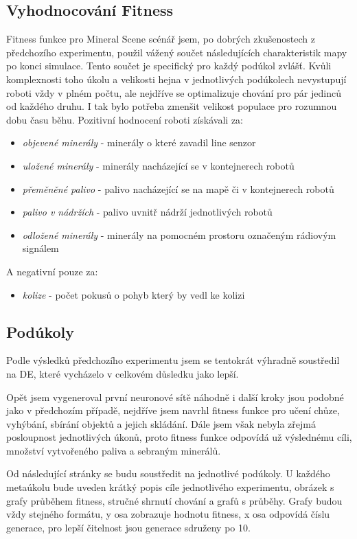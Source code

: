 \subsection*{Vyhodnocování Fitness}
Fitness funkce pro Mineral Scene scénář jsem, po dobrých zkušenostech z předchozího experimentu, použil vážený součet následujících charakteristik mapy po konci simulace. Tento součet je specifický pro každý podúkol zvlášť. Kvůli komplexnosti toho úkolu a velikosti hejna v jednotlivých podúkolech nevystupují roboti vždy v plném počtu, ale nejdříve se optimalizuje chování pro pár jedinců od každého druhu. I tak bylo potřeba zmenšit velikost populace pro rozumnou dobu času běhu. Pozitivní hodnocení roboti získávali za: 
\begin{itemize}
	\item \textit{objevené minerály} - minerály o které zavadil line senzor
	\item \textit{uložené minerály} - minerály nacházející se v kontejnerech robotů 
	\item \textit{přeměněné palivo} - palivo nacházející se na mapě či v kontejnerech robotů
	\item \textit{palivo v nádržích} - palivo uvnitř nádrží jednotlivých robotů
	\item \textit{odložené minerály} - minerály na pomocném prostoru označeným rádiovým signálem
\end{itemize}
A negativní pouze za: 
\begin{itemize}
	\item \textit{kolize} - počet pokusů o pohyb který by vedl ke kolizi
\end{itemize}
\subsection*{Podúkoly}
Podle výsledků předchozího experimentu jsem se tentokrát výhradně soustředil na DE, které vycházelo v celkovém důsledku jako lepší.
\par 
Opět jsem vygeneroval první neuronové sítě náhodně i další kroky jsou podobné jako v předchozím případě, nejdříve jsem navrhl fitness funkce pro učení chůze, vyhýbání, sbírání objektů a jejich skládání. Dále jsem však nebyla zřejmá posloupnost jednotlivých úkonů, proto fitness funkce odpovídá už výslednému cíli, množství vytvořeného paliva a sebraným minerálů.
\par 
Od následující stránky se budu soustředit na jednotlivé podúkoly. U každého metaúkolu bude uveden krátký popis cíle jednotlivého experimentu, obrázek s grafy průběhem fitness, stručné shrnutí chování a grafů s průběhy. Grafy budou vždy stejného formátu,  y osa zobrazuje hodnotu fitness, x osa odpovídá číslu generace, pro lepší čitelnost jsou generace sdruženy po 10. 
\clearpage

